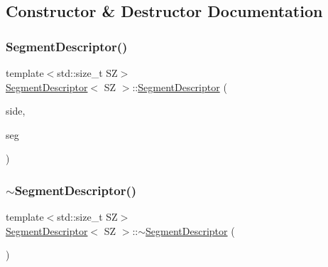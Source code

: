\subsection{Constructor \& Destructor Documentation}
\mbox{\label{classSegmentDescriptor_a042a4c43ff3213dc643a3b8fb40c9b05}} 
\subsubsection{\texorpdfstring{Segment\+Descriptor()}{SegmentDescriptor()}}
{\footnotesize\ttfamily template$<$std\+::size\+\_\+t SZ$>$ \\
\hyperlink{classSegmentDescriptor}{Segment\+Descriptor}$<$ SZ $>$\+::\hyperlink{classSegmentDescriptor}{Segment\+Descriptor} (\begin{DoxyParamCaption}\item[{\hyperlink{proxy_8hpp_a249fda9ad200a554304ecf8de90d6877}{Channel\+Side}}]{side,  }\item[{\hyperlink{classSegment}{Segment}$<$ SZ $>$ \&}]{seg }\end{DoxyParamCaption})\hspace{0.3cm}{\ttfamily [inline]}}

\mbox{\label{classSegmentDescriptor_a1b8897effdc10f093db07328aa9eb64f}} 
\subsubsection{\texorpdfstring{$\sim$\+Segment\+Descriptor()}{~SegmentDescriptor()}}
{\footnotesize\ttfamily template$<$std\+::size\+\_\+t SZ$>$ \\
\hyperlink{classSegmentDescriptor}{Segment\+Descriptor}$<$ SZ $>$\+::$\sim$\hyperlink{classSegmentDescriptor}{Segment\+Descriptor} (\begin{DoxyParamCaption}{ }\end{DoxyParamCaption})\hspace{0.3cm}{\ttfamily [inline]}}



